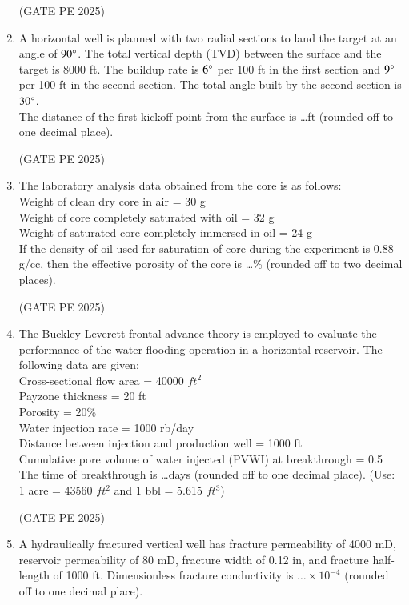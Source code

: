\documentclass[journal,12pt,onecolumn]{IEEEtran}
\theoremstyle{remark}
\begin{document}
\begin{enumerate}
\hfill{(GATE PE 2025)}

\item A horizontal well is planned with two radial sections to land the target at an angle of $90\degree$. The total vertical depth (TVD) between the surface and the target is 8000 ft. The buildup rate is $6\degree$ per 100 ft in the first section and $9\degree$ per 100 ft in the second section. The total angle built by the second section is $30\degree$.\\
The distance of the first kickoff point from the surface is \dots ft (rounded off to one decimal place).

\hfill{(GATE PE 2025)}

\item The laboratory analysis data obtained from the core is as follows:\\
Weight of clean dry core in air = 30 g\\
Weight of core completely saturated with oil = 32 g\\
Weight of saturated core completely immersed in oil = 24 g\\
If the density of oil used for saturation of core during the experiment is 0.88 g/cc, then the effective porosity of the core is \dots \% (rounded off to two decimal places).

\hfill{(GATE PE 2025)}

\item The Buckley Leverett frontal advance theory is employed to evaluate the performance of the water flooding operation in a horizontal reservoir. 
The following data are given:\\
Cross-sectional flow area = 40000 $ft^2$\\
Payzone thickness = 20 ft\\
Porosity = 20\%\\
Water injection rate = 1000 rb/day\\
Distance between injection and production well = 1000 ft\\
Cumulative pore volume of water injected (PVWI) at breakthrough = 0.5\\
The time of breakthrough is \dots days (rounded off to one decimal place).
(Use: 1 acre = 43560 $ft^2$ and 1 bbl = 5.615 $ft^3$)

\hfill{(GATE PE 2025)}

\item A hydraulically fractured vertical well has fracture permeability of 4000 mD, reservoir permeability of 80 mD, fracture width of 0.12 in, and fracture half-length of 1000 ft.
Dimensionless fracture conductivity is $\dots \times 10^{-4}$  (rounded off to one decimal place).


\end{enumerate}
\end{document}
